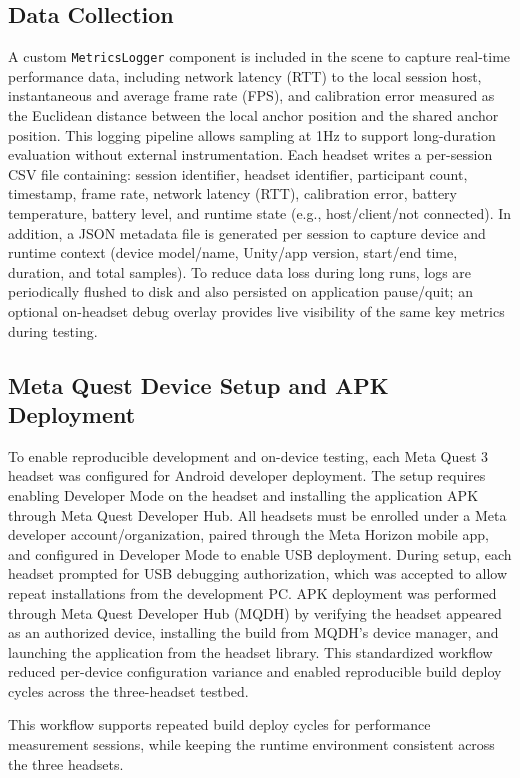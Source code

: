 \subsection{Data Collection}
\label{sec:prototype-logging}
A custom \texttt{MetricsLogger} component is included in the scene to capture real-time performance data, including network latency (RTT) to the local session host, instantaneous and average frame rate (FPS), and calibration error measured as the Euclidean distance between the local anchor position and the shared anchor position.
This logging pipeline allows sampling at 1Hz to support long-duration evaluation without external instrumentation. Each headset writes a per-session CSV file containing: session identifier, headset identifier, participant count, timestamp, frame rate, network latency (RTT), calibration error, battery temperature, battery level, and runtime state (e.g., host/client/not connected). In addition, a JSON metadata file is generated per session to capture device and runtime context (device model/name, Unity/app version, start/end time, duration, and total samples). To reduce data loss during long runs, logs are periodically flushed to disk and also persisted on application pause/quit; an optional on-headset debug overlay provides live visibility of the same key metrics during testing.


\subsection{Meta Quest Device Setup and APK Deployment}
\label{sec:prototype-deployment}
To enable reproducible development and on-device testing, each Meta Quest 3 headset was configured for Android developer deployment. The setup requires enabling Developer Mode on the headset and installing the application APK through Meta Quest Developer Hub\cite{MetaMQDHGettingStarted2025}.
All headsets must be enrolled under a Meta developer account/organization, paired through the Meta Horizon mobile app, and configured in Developer Mode to enable USB deployment. During setup, each headset prompted for USB debugging authorization, which was accepted to allow repeat installations from the development PC. APK deployment was performed through Meta Quest Developer Hub (MQDH) by verifying the headset appeared as an authorized device, installing the build from MQDH's device manager, and launching the application from the headset library. This standardized workflow reduced per-device configuration variance and enabled reproducible build deploy cycles across the three-headset testbed.

This workflow supports repeated build deploy cycles for performance measurement sessions, while keeping the runtime environment consistent across the three headsets.
